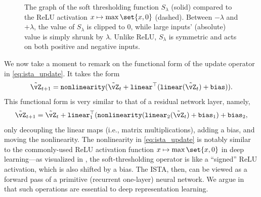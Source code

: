 \documentclass[../../book-main.tex]{subfiles}
\begin{document}
\begin{figure}
    \centering
    \caption{The graph of the soft thresholding function
        \(S_{\lambda}\) (solid) compared to the ReLU activation
        \(x \mapsto \max\set{x, 0}\) (dashed).
        Between \(-\lambda\) and \(+\lambda\), the value
        of \(S_{\lambda}\) is clipped to \(0\), while large inputs'
        (absolute) value is simply shrunk by \(\lambda\).
        Unlike ReLU, \(S_{\lambda}\) is symmetric and acts on both
    positive and negative inputs.}
    \label{fig:soft-thresholding}
\end{figure}

We now take a moment to remark on the functional form of the update
operator in \eqref{eq:ista_update}. It takes the form
\begin{equation}
    \tilde{\vZ}_{t + 1} = \texttt{nonlinearity}(\tilde{\vZ}_{t} +
    \texttt{linear}^{\top}(\texttt{linear}(\tilde{\vZ}_{t}) + \texttt{bias})).
\end{equation}
This functional form is very similar to that of a residual network
layer, namely,
\begin{equation}
    \tilde{\vZ}_{t + 1} = \tilde{\vZ}_{t} +
    \texttt{linear}_{1}^{\top}(\texttt{nonlinearity}(\texttt{linear}_{2}(\tilde{\vZ}_{t})
        + \texttt{bias}_{1}) + \texttt{bias}_{2},
    \end{equation}
    only decoupling the linear maps (i.e., matrix multiplications),
    adding a bias, and moving the nonlinearity.
    The nonlinearity in \eqref{eq:ista_update} is notably similar to the
    commonly-used ReLU activation function $x \mapsto \max\set{x, 0}$ in deep
    learning---as visualized in , the
    soft-thresholding operator is like a ``signed''
    ReLU activation, which is also shifted by a bias.
    The ISTA, then, can be viewed as a forward pass of a primitive
    (recurrent one-layer) neural network. We argue in
     that such operations are essential to
    deep representation learning.
\end{document}

